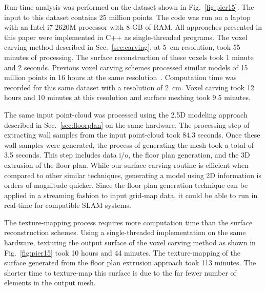\documentclass[10pt,twocolumn,twoside]{IEEEtran}
\begin{document}

Run-time analysis was performed on the dataset shown in Fig.~\ref{fig:pier15}.  The input to this dataset contains 25 million points.  The code was run on a laptop with an Intel i7-2620M processor with 8 GB of RAM.  All approaches presented in this paper were implemented in C++ as single-threaded programs.  The voxel carving method described in Sec.~\ref{sec:carving}, at 5~cm resolution, took 55 minutes of processing.  The surface reconstruction of these voxels took 1 minute and 2 seconds.  Previous voxel carving schemes processed similar models of 15 million points in 16 hours at the same resolution~\cite{Carving}.  Computation time was recorded for this same dataset with a resolution of 2~cm.  Voxel carving took 12 hours and 10 minutes at this resolution and surface meshing took 9.5 minutes.

The same input point-cloud was processed using the 2.5D modeling approach described in Sec.~\ref{sec:floorplan} on the same hardware.  The processing step of extracting wall samples from the input point-cloud took 84.3 seconds.  Once these wall samples were generated, the process of generating the mesh took a total of 3.5 seconds.  This step includes data i/o, the floor plan generation, and the 3D extrusion of the floor plan.  While our surface carving routine is efficient when compared to other similar techniques, generating a model using 2D information is orders of magnitude quicker.  Since the floor plan generation technique can be applied in a streaming fashion to input grid-map data, it could be able to run in real-time for compatible SLAM systems.

The texture-mapping process requires more computation time than the surface reconstruction schemes.  Using a single-threaded implementation on the same hardware, texturing the output surface of the voxel carving method as shown in Fig.~\ref{fig:pier15} took 10 hours and 44 minutes.  The texture-mapping of the surface generated from the floor plan extrusion approach took 113 minutes. The shorter time to texture-map this surface is due to the far fewer number of elements in the output mesh.
\end{document}
